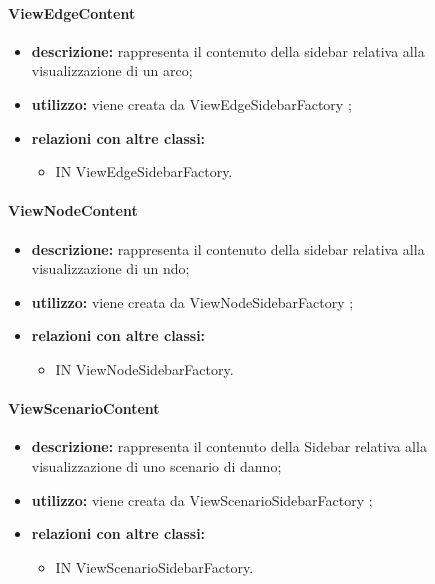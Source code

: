 \paragraph{ViewEdgeContent}
\begin{itemize}
	\item \textbf{descrizione:} rappresenta il contenuto della sidebar relativa alla visualizzazione di un arco;
	\item \textbf{utilizzo:} viene creata da ViewEdgeSidebarFactory ;
	\item \textbf{relazioni con altre classi:} 
	\begin{itemize}
		\item IN ViewEdgeSidebarFactory.
	\end{itemize}
\end{itemize}
\paragraph{ViewNodeContent}
\begin{itemize}
	\item \textbf{descrizione:} rappresenta il contenuto della sidebar relativa alla visualizzazione di un ndo;
	\item \textbf{utilizzo:} viene creata da ViewNodeSidebarFactory ;
	\item \textbf{relazioni con altre classi:} 
	\begin{itemize}
		\item IN ViewNodeSidebarFactory.
	\end{itemize}
\end{itemize}
\paragraph{ViewScenarioContent}
\begin{itemize}
	\item \textbf{descrizione:} rappresenta il contenuto della Sidebar relativa alla visualizzazione di uno scenario di danno;
	\item \textbf{utilizzo:} viene creata da ViewScenarioSidebarFactory ;
	\item \textbf{relazioni con altre classi:} 
	\begin{itemize}
		\item IN ViewScenarioSidebarFactory.
	\end{itemize}
\end{itemize}
\newpage
